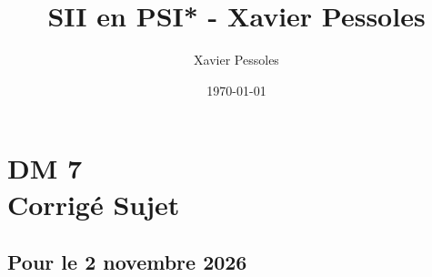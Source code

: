 \documentclass[
	fontsize=10pt, %
	twoside=false, %
]{kaobook}
\newcommand{\repRel}{../../../..}
\newcommand{\repStyle}{\repRel/Style}
\begin{document}

\titlehead{Document Template}
\title[SII en PSI* - Xavier Pessoles]{SII en PSI* - Xavier Pessoles}
\author[XP]{Xavier Pessoles}
\date{\today}

%
\frontmatter %


%
\mainmatter %


\setcounter{margintocdepth}{\sectiontocdepth}
\graphicspath{{\repStyle/png}}

\pagestyle{xp.scrheadings}



\newcommand{\repExo}{}
\newcommand{\nomExo}{}

\livretfalse %
\proffalse
\collefalse\colletrue
\normaltrue

\newcommand{\exer}{\subsection*}

\chapter*{DM 7 \\ 
\ifprof Corrigé \else Sujet \fi}


\section*{Pour le 2 novembre 2026}



\graphicspath{{\repStyle/png/}{../../../../Sujets_Concours/2005/EA_Plateau/images/}{../../../../Sujets_Concours/2015/CCMP_PSI_Lola/images/}}






\end{document}
